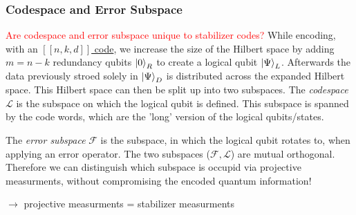 \subsubsection{Codespace and Error Subspace}\label{sec:codespace_error_subspace}
\textcolor{red}{Are codespace and error subspace unique to stabilizer codes?}
While encoding, with an \hyperref[sssec:nkd_notation]{$[[n,k,d]]$ code}, we increase the size of the Hilbert space by adding $m=n-k$ redundancy qubits $\ket{0}_R$
to create a logical qubit $\ket{\Psi}_L$. 
Afterwards the data previously stroed solely in $\ket{\Psi}_D$ is distributed across the expanded Hilbert space.
This Hilbert space can then be split up into two subspaces. 
The \textit{codespace} $\mathcal{L}$ is the subspace on which the logical qubit is defined. \cite{QECintro}
This subspace is spanned by the code words, which are the 'long' version of the logical qubits/states.

The \textit{error subspace} $\mathcal{F}$ is the subspace, in which the logical qubit rotates to, when applying an error operator. 
The two subspaces ($\mathcal{F} , \mathcal{L}$) are mutual orthogonal. 
Therefore we can distinguish which subspace is occupid via projective measurments, 
without compromising the encoded quantum information!  \cite{QECintro}

$\rightarrow$ projective measurments = stabilizer measurments


